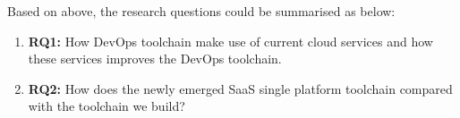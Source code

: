 \par
Based on above, the research questions could be summarised as below:
\begin{enumerate}
    \item \textbf{RQ1:} How DevOps toolchain make use of current cloud services and how these services improves the DevOps toolchain.
    \item \textbf{RQ2:} How does the newly emerged SaaS single platform toolchain compared with the toolchain we build?
\end{enumerate}
